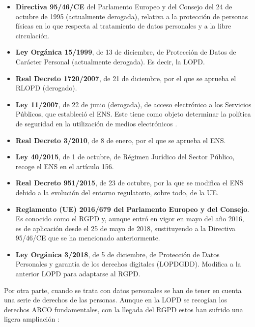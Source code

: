 \begin{itemize}
    \item \textbf{Directiva 95/46/CE} del Parlamento Europeo y del Consejo del 24 de octubre de 1995 (actualmente derogada), relativa a la protección de personas físicas en lo que respecta al tratamiento de datos personales y a la libre circulación.
    
    \item \textbf{Ley Orgánica 15/1999}, de 13 de diciembre, de Protección de Datos de Carácter Personal (actualmente derogada). Es decir, la \acf{LOPD}.
    
    \item \textbf{Real Decreto 1720/2007}, de 21 de diciembre, por el que se aprueba el \acf{RLOPD} (derogado).
    
    \item \textbf{Ley 11/2007}, de 22 de junio (derogada), de acceso electrónico a los Servicios Públicos, que estableció el \acs{ENS}. Este tiene como objeto determinar la política de seguridad en la utilización de medios electrónicos \cite{ens}.
    
    \item \textbf{Real Decreto 3/2010}, de 8 de enero, por el que se aprueba el \acs{ENS}.
    
    \item \textbf{Ley 40/2015}, de 1 de octubre, de Régimen Jurídico del Sector Público, recoge el \acs{ENS} en el artículo 156.
    
    \item \textbf{Real Decreto 951/2015}, de 23 de octubre, por la que se modifica el \acs{ENS} debido a la evolución del entorno regulatorio, sobre todo, de la \acs{UE}.
    
    \item \textbf{Reglamento (\acs{UE}) 2016/679 del Parlamento Europeo y del Consejo}. Es conocido como el \acf{RGPD} y, aunque entró en vigor en mayo del año 2016, es de aplicación desde el 25 de mayo de 2018, sustituyendo a la Directiva 95/46/CE que se ha mencionado anteriormente.
    
    \item \textbf{Ley Orgánica 3/2018}, de 5 de diciembre, de Protección de Datos Personales y garantía de los derechos digitales (\acs{LOPDGDD}). Modifica a la anterior \acs{LOPD} para adaptarse al \acs{RGPD}.
\end{itemize}

Por otra parte, cuando se trata con datos personales se han de tener en cuenta una serie de derechos de las personas. Aunque en la \acs{LOPD} se recogían los derechos ARCO fundamentales, con la llegada del \acs{RGPD} estos han sufrido una ligera ampliación \cite{aepdderechos}:

